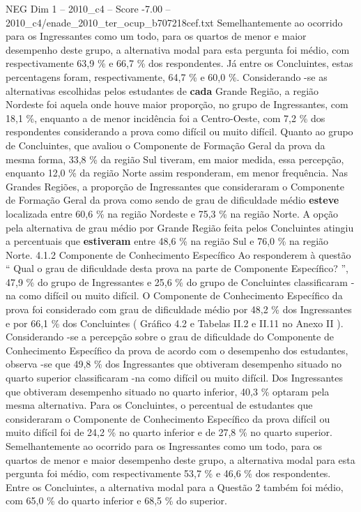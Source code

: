 \begin{textsample}{NEG Dim 1 – 2010\_c4 – Score -7.00 – 2010\_c4/enade\_2010\_ter\_ocup\_b707218cef.txt}
Semelhantemente ao ocorrido para os Ingressantes como um todo, para os quartos de menor e maior desempenho deste grupo, a alternativa modal para esta pergunta foi médio, com respectivamente 63,9 \% e 66,7 \% dos respondentes.
Já entre os Concluintes, estas percentagens foram, respectivamente, 64,7 \% e 60,0 \%.
Considerando -se as alternativas escolhidas pelos estudantes de \textbf{cada} Grande Região, a região Nordeste foi aquela onde houve maior proporção, no grupo de Ingressantes, com 18,1 \%, enquanto a de menor incidência foi a Centro-Oeste, com 7,2 \% dos respondentes considerando a prova como difícil ou muito difícil.
Quanto ao grupo de Concluintes, que avaliou o Componente de Formação Geral da prova da mesma forma, 33,8 \% da região Sul tiveram, em maior medida, essa percepção, enquanto 12,0 \% da região Norte assim responderam, em menor frequência.
Nas Grandes Regiões, a proporção de Ingressantes que consideraram o Componente de Formação Geral da prova como sendo de grau de dificuldade médio \textbf{esteve} localizada entre 60,6 \% na região Nordeste e 75,3 \% na região Norte.
A opção pela alternativa de grau médio por Grande Região feita pelos Concluintes atingiu a percentuais que \textbf{estiveram} entre 48,6 \% na região Sul e 76,0 \% na região Norte. 4.1.2 Componente de Conhecimento Específico Ao responderem à questão “ Qual o grau de dificuldade desta prova na parte de Componente Específico? ”, 47,9 \% do grupo de Ingressantes e 25,6 \% do grupo de Concluintes classificaram -na como difícil ou muito difícil.
O Componente de Conhecimento Específico da prova foi considerado com grau de dificuldade médio por 48,2 \% dos Ingressantes e por 66,1 \% dos Concluintes ( Gráfico 4.2 e Tabelas II.2 e II.11 no Anexo II ).
Considerando -se a percepção sobre o grau de dificuldade do Componente de Conhecimento Específico da prova de acordo com o desempenho dos estudantes, observa -se que 49,8 \% dos Ingressantes que obtiveram desempenho situado no quarto superior classificaram -na como difícil ou muito difícil.
Dos Ingressantes que obtiveram desempenho situado no quarto inferior, 40,3 \% optaram pela mesma alternativa.
Para os Concluintes, o percentual de estudantes que consideraram o Componente de Conhecimento Específico da prova difícil ou muito difícil foi de 24,2 \% no quarto inferior e de 27,8 \% no quarto superior.
Semelhantemente ao ocorrido para os Ingressantes como um todo, para os quartos de menor e maior desempenho deste grupo, a alternativa modal para esta pergunta foi médio, com respectivamente 53,7 \% e 46,6 \% dos respondentes.
Entre os Concluintes, a alternativa modal para a Questão 2 também foi médio, com 65,0 \% do quarto inferior e 68,5 \% do superior.

\end{textsample}
